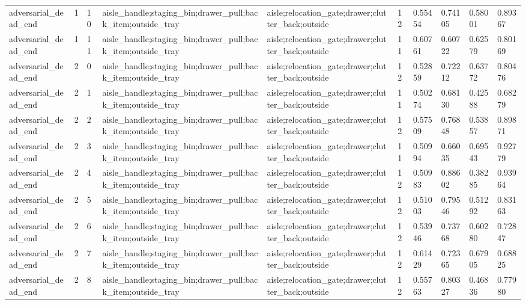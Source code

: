 \documentclass{article}
\begin{document}
\begin{table}[tbp]
{\begin{tabular}{llllllllll}
adversarial\_dead\_end & 1 & 10 & aisle\_handle;staging\_bin;drawer\_pull;back\_item;outside\_tray & aisle;relocation\_gate;drawer;clutter\_back;outside & 12 & 0.55454 & 0.74105 & 0.58001 & 0.89367 \\
adversarial\_dead\_end & 1 & 11 & aisle\_handle;staging\_bin;drawer\_pull;back\_item;outside\_tray & aisle;relocation\_gate;drawer;clutter\_back;outside & 11 & 0.60761 & 0.60722 & 0.62579 & 0.80169 \\
adversarial\_dead\_end & 2 & 0 & aisle\_handle;staging\_bin;drawer\_pull;back\_item;outside\_tray & aisle;relocation\_gate;drawer;clutter\_back;outside & 12 & 0.52859 & 0.72212 & 0.63772 & 0.80476 \\
adversarial\_dead\_end & 2 & 1 & aisle\_handle;staging\_bin;drawer\_pull;back\_item;outside\_tray & aisle;relocation\_gate;drawer;clutter\_back;outside & 11 & 0.50274 & 0.68130 & 0.42588 & 0.68279 \\
adversarial\_dead\_end & 2 & 2 & aisle\_handle;staging\_bin;drawer\_pull;back\_item;outside\_tray & aisle;relocation\_gate;drawer;clutter\_back;outside & 12 & 0.57509 & 0.76848 & 0.53857 & 0.89871 \\
adversarial\_dead\_end & 2 & 3 & aisle\_handle;staging\_bin;drawer\_pull;back\_item;outside\_tray & aisle;relocation\_gate;drawer;clutter\_back;outside & 11 & 0.50994 & 0.66035 & 0.69543 & 0.92779 \\
adversarial\_dead\_end & 2 & 4 & aisle\_handle;staging\_bin;drawer\_pull;back\_item;outside\_tray & aisle;relocation\_gate;drawer;clutter\_back;outside & 12 & 0.50983 & 0.88602 & 0.38285 & 0.93964 \\
adversarial\_dead\_end & 2 & 5 & aisle\_handle;staging\_bin;drawer\_pull;back\_item;outside\_tray & aisle;relocation\_gate;drawer;clutter\_back;outside & 12 & 0.51003 & 0.79546 & 0.51292 & 0.83163 \\
adversarial\_dead\_end & 2 & 6 & aisle\_handle;staging\_bin;drawer\_pull;back\_item;outside\_tray & aisle;relocation\_gate;drawer;clutter\_back;outside & 12 & 0.53946 & 0.73768 & 0.60280 & 0.72847 \\
adversarial\_dead\_end & 2 & 7 & aisle\_handle;staging\_bin;drawer\_pull;back\_item;outside\_tray & aisle;relocation\_gate;drawer;clutter\_back;outside & 12 & 0.61429 & 0.72365 & 0.67905 & 0.68825 \\
adversarial\_dead\_end & 2 & 8 & aisle\_handle;staging\_bin;drawer\_pull;back\_item;outside\_tray & aisle;relocation\_gate;drawer;clutter\_back;outside & 12 & 0.55763 & 0.80327 & 0.46836 & 0.77980 \\

\end{tabular}}
\end{table}
\end{document}
